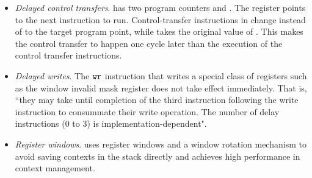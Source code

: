\begin{itemize}
	\item \textit{Delayed control transfers}.
	\sparc{} has two program counters \pc{} and \npc.
    The \npc{} register points to the next instruction
    to run.
	Control-transfer instructions in \sparc{}
	change \npc{} instead of \pc{} to the target program point,
    while \pc{} takes the original value of \npc.
	This makes the control transfer to happen one cycle later
    than the execution of the control transfer instructions.
	
	\item \textit{Delayed writes}.
	The $\texttt{wr}$ instruction that writes a special class
    of registers such as the window invalid mask register
    \regwim{} does not take effect immediately.
    That is, ``they may take until
    completion of the third instruction following the write
    instruction to consummate their write operation.
    The number of delay instructions (0 to 3)
    is implementation-dependent".


	\item \textit{Register windows}.
	\sparc{} uses register windows
	and a window rotation mechanism
	to avoid saving contexts in the stack directly
    and achieves high performance in context management.
\end{itemize}

